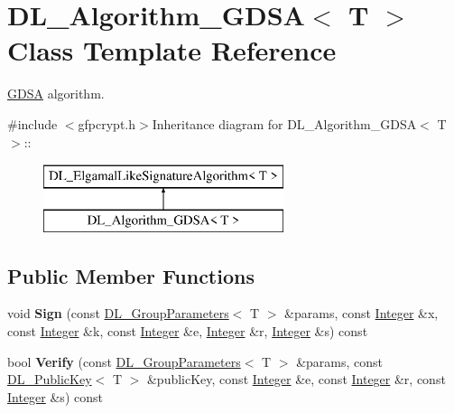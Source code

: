 \hypertarget{class_d_l___algorithm___g_d_s_a}{
\section{DL\_\-Algorithm\_\-GDSA$<$ T $>$ Class Template Reference}
\label{class_d_l___algorithm___g_d_s_a}
}


\hyperlink{struct_g_d_s_a}{GDSA} algorithm.  


{\ttfamily \#include $<$gfpcrypt.h$>$}Inheritance diagram for DL\_\-Algorithm\_\-GDSA$<$ T $>$::\begin{figure}[H]
\begin{center}
\leavevmode
\includegraphics[height=2cm]{class_d_l___algorithm___g_d_s_a}
\end{center}
\end{figure}
\subsection*{Public Member Functions}
\begin{DoxyCompactItemize}
\item 
\hypertarget{class_d_l___algorithm___g_d_s_a_a8a60aa64a15eced1c26686f8eac089d9}{
void {\bfseries Sign} (const \hyperlink{class_d_l___group_parameters}{DL\_\-GroupParameters}$<$ T $>$ \&params, const \hyperlink{class_integer}{Integer} \&x, const \hyperlink{class_integer}{Integer} \&k, const \hyperlink{class_integer}{Integer} \&e, \hyperlink{class_integer}{Integer} \&r, \hyperlink{class_integer}{Integer} \&s) const }
\label{class_d_l___algorithm___g_d_s_a_a8a60aa64a15eced1c26686f8eac089d9}

\item 
\hypertarget{class_d_l___algorithm___g_d_s_a_a83f7c3dc0f909833383df3b97e0a8043}{
bool {\bfseries Verify} (const \hyperlink{class_d_l___group_parameters}{DL\_\-GroupParameters}$<$ T $>$ \&params, const \hyperlink{class_d_l___public_key}{DL\_\-PublicKey}$<$ T $>$ \&publicKey, const \hyperlink{class_integer}{Integer} \&e, const \hyperlink{class_integer}{Integer} \&r, const \hyperlink{class_integer}{Integer} \&s) const }
\label{class_d_l___algorithm___g_d_s_a_a83f7c3dc0f909833383df3b97e0a8043}

\end{DoxyCompactItemize}
